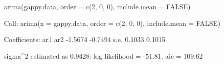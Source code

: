 \begin{Schunk}
\begin{Sinput}
 arima(gappy.data, order = c(2, 0, 0), include.mean = FALSE)
\end{Sinput}
\begin{Soutput}
Call:
arima(x = gappy.data, order = c(2, 0, 0), include.mean = FALSE)

Coefficients:
          ar1      ar2
      -1.5674  -0.7494
s.e.   0.1033   0.1015

sigma^2 estimated as 0.9428:  log likelihood = -51.81,  aic = 109.62
\end{Soutput}
\end{Schunk}
